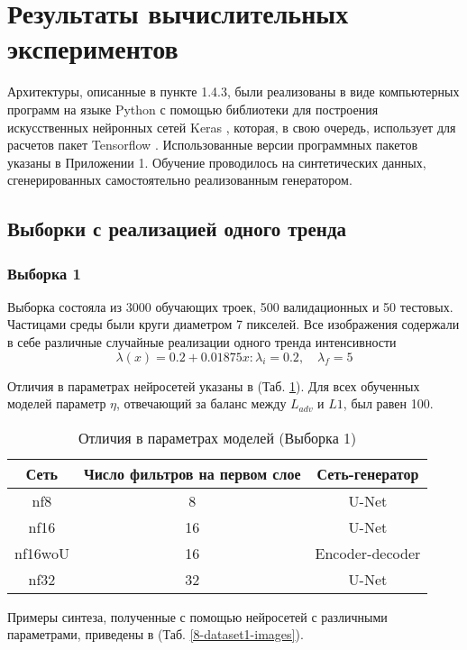 \clearpage
\section{Результаты вычислительных экспериментов}
	Архитектуры, описанные в пункте 1.4.3, были реализованы в виде компьютерных программ на языке Python с помощью библиотеки для построения искусственных нейронных сетей Keras \cite{keras}, которая, в свою очередь, использует для расчетов пакет Tensorflow \cite{tf}. Использованные версии программных пакетов указаны в Приложении 1. Обучение проводилось на синтетических данных, сгенерированных самостоятельно реализованным генератором. 
	\subsection{Выборки с реализацией одного тренда}
		\subsubsection{Выборка 1}
			Выборка состояла из 3000 обучающих троек, 500 валидационных и 50 тестовых. Частицами среды были круги диаметром 7 пикселей. Все изображения содержали в себе различные случайные реализации одного тренда интенсивности
			$$\lambda(x) = 0.2 + 0.01875x : \lambda_i = 0.2, \quad \lambda_f = 5$$
			
			Отличия в параметрах нейросетей указаны в (Таб. \ref{8-sand-trend2-nns}). Для всех обученных моделей параметр $\eta$, отвечающий за баланс между $L_{adv}$ и $L1$, был равен 100.
			
			\begin{table}[h!]
				\begin{center}
					\begin{tabular}{|c|c|c|}
						\hline
						Сеть & Число фильтров на первом слое & Сеть-генератор \\
						\hline
						nf8 & 8 & U-Net \\
						\hline
						nf16 & 16 & U-Net \\
						\hline
						nf16woU & 16 & Encoder-decoder \\
						\hline
						nf32 & 32 & U-Net \\
						\hline
					\end{tabular}
					\caption{Отличия в параметрах моделей (Выборка 1)}
					\label{8-sand-trend2-nns}
				\end{center}
			\end{table}
			
			Примеры синтеза, полученные с помощью нейросетей с различными параметрами, приведены в (Таб. \ref{8-dataset1-images}).
			
